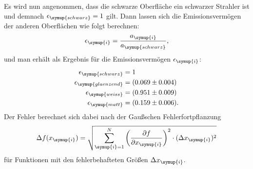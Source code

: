 Es wird nun angenommen, dass die schwarze Oberfläche ein schwarzer Strahler ist
und demnach $\epsilon_\symup{schwarz} = 1$ gilt.
Dann lassen sich die Emissionsvermögen der anderen Oberflächen wie folgt berechnen:
\begin{equation}
  \epsilon_\symup{i} = \frac{a_\symup{i}}{a_\symup{schwarz}},
  \label{eqn:epsilon}
\end{equation}
und man erhält als Ergebnis für die Emissionsvermögen $\epsilon_\symup{i}$:
\begin{align*}
  \epsilon_\symup{schwarz}   &= 1 \\
  \epsilon_\symup{glaenzend} &= (0.069\pm0.004) \\
  \epsilon_\symup{weiss}     &= (0.951\pm0.009) \\
  \epsilon_\symup{matt}      &= (0.159\pm0.006).
\end{align*}
Der Fehler berechnet sich dabei nach der Gaußschen Fehlerfortpflanzung
\begin{equation}
  \Delta f(x_\symup{i}) = \sqrt{\sum_{\symup{i}=1}^N
  \left(\frac{\partial f}{\partial x_\symup{i}}\right)^2 \cdot
  (\Delta x_\symup{i})^2}
\end{equation}
für Funktionen mit den fehlerbehafteten Größen $\Delta x_\symup{i}$.


